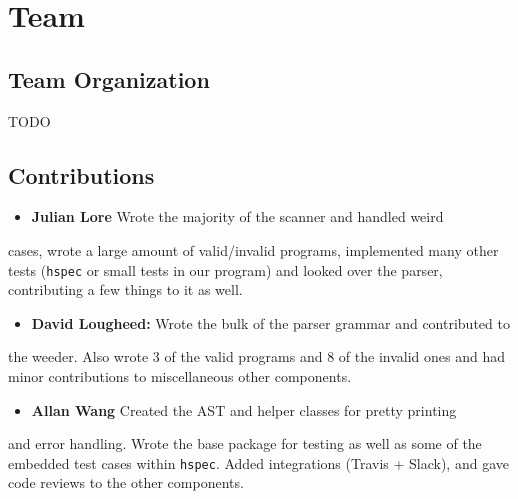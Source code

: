 \documentclass[11pt]{article}
\begin{document}
\section{Team}
\label{sec:orgf67c24e}
\subsection{Team Organization}
\label{sec:org67424ef}
TODO
\subsection{Contributions}
\label{sec:org61ac01d}
\begin{itemize}
\item \textbf{Julian Lore} Wrote the majority of the scanner and handled weird
\end{itemize}
cases, wrote a large amount of valid/invalid programs, implemented
many other tests (\texttt{hspec} or small tests in our program) and looked
over the parser, contributing a few things to it as well.

\begin{itemize}
\item \textbf{David Lougheed:} Wrote the bulk of the parser grammar and contributed to
\end{itemize}
the weeder. Also wrote 3 of the valid programs and 8 of the
invalid ones and had minor contributions to miscellaneous other components.

\begin{itemize}
\item \textbf{Allan Wang} Created the AST and helper classes for pretty printing
\end{itemize}
and error handling.  Wrote the base package for testing as well as
some of the embedded test cases within \texttt{hspec}.  Added integrations
(Travis + Slack), and gave code reviews to the other components.
\end{document}

